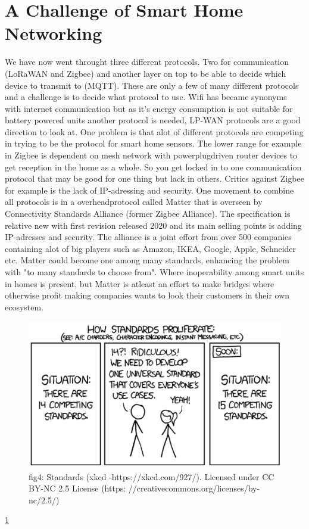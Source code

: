 \documentclass[article,a4paper]{IEEEtran}
\begin{document}
    \section{A Challenge of Smart Home Networking}
    We have now went throught three different protocols. Two for communication (LoRaWAN and Zigbee) and another layer on top to be able to decide which device to transmit to (MQTT). These are only a few of many different protocols and a challenge is to decide what protocol to use. Wifi has became synonyms with internet communication but as it's energy consumption is not suitable for battery powered units another protocol is needed, LP-WAN protocols are a good direction to look at. One problem is that alot of different protocols are competing in trying to be the protocol for smart home sensors. The lower range for example in Zigbee is dependent on mesh network with powerplugdriven router devices to get reception in the home as a whole. So you get locked in to one communication protocol that may be good for one thing but lack in others. Critics against Zigbee for example is the lack of IP-adressing and security. One movement to combine all protocols is in a overheadprotocol called Matter \cite{Matterspec} that is overseen by Connectivity Standards Alliance (former Zigbee Alliance). The specification is relative new with first revision released 2020 and its main selling points is adding IP-adresses and security. The alliance is a joint effort from over 500 companies containing alot of big players such as Amazon, IKEA, Google, Apple, Schneider etc. Matter could become one among many standards, enhancing the problem with "to many standards to choose from". Where inoperability among smart units in homes is present, but Matter is atleast an effort to make bridges where otherwise profit making companies wants to look their customers in their own ecosystem.   
    \begin{figure}
        \includegraphics[width=\columnwidth]{NewStandard.png} 
        \caption{ fig4: Standards (xkcd -https://xkcd.com/927/). Licensed under CC BY-NC 2.5 License (https: //creativecommons.org/licenses/by-nc/2.5/) }
        \label{fig4: Standards (xkcd -https://xkcd.com/927/). Licensed under CC BY-NC 2.5 License (https: //creativecommons.org/licenses/by-nc/2.5/)}   
    \end{figure}
    \ref{fig4: Standards (xkcd -https://xkcd.com/927/). Licensed under CC BY-NC 2.5 License (https: //creativecommons.org/licenses/by-nc/2.5/)} 
\end{document}
